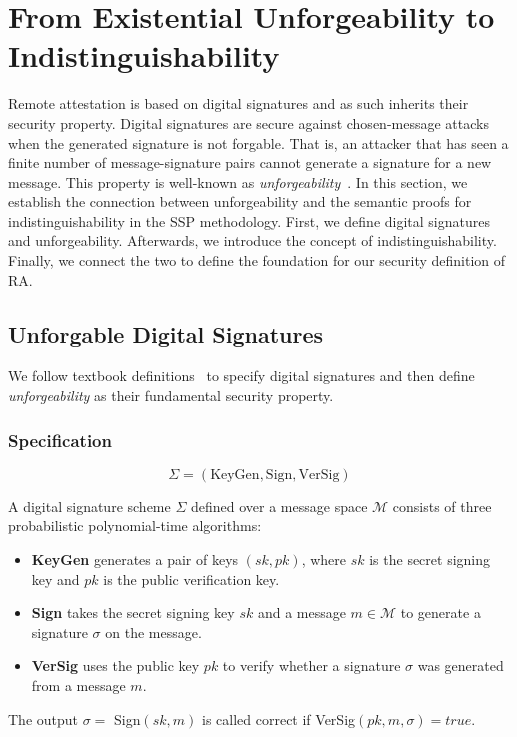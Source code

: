 \section{From Existential Unforgeability to Indistinguishability}
\label{sec:TheoryFound}
%
%
Remote attestation is based on digital signatures and as such
inherits their security property.
%
Digital signatures are secure against chosen-message attacks when
the generated signature is not forgable.
%
That is, an attacker that has seen a finite number of message-signature
pairs cannot generate a signature for a new message.
%
This property is well-known as \emph{unforgeability}~\cite{goldwasser1988digital}.
%
In this section, we establish the connection between
unforgeability and the semantic proofs for indistinguishability in
the SSP methodology.
%
First, we define digital signatures and unforgeability.
%
Afterwards, we introduce the concept of indistinguishability.
%
Finally, we connect the two to define the foundation for
our security definition of RA.
%

\subsection{Unforgable Digital Signatures}

%
We follow textbook definitions~\cite{joy,companion} to specify digital
signatures and then define \emph{unforgeability} as their fundamental
security property.
%

\subsubsection{Specification}
\begin{definition}
  \label{def:sig:scheme}
  \[
  \Sigma=(\text{KeyGen},\text{Sign},\text{VerSig})
  \]
\end{definition}
%
A digital signature scheme $\Sigma$
defined over a message space $\mathcal{M}$ consists
of three probabilistic polynomial-time algorithms:
%
\begin{itemize}
    \item \textbf{KeyGen} generates
    a pair of keys $(sk, pk)$, where $sk$ is the secret signing
    key and $pk$ is the public verification key. 
    \item\textbf{Sign} takes the secret signing key $sk$ and
    a message $m\in\mathcal{M}$ to generate a signature $\sigma$ on the message.
    \item\textbf{VerSig} uses the public key $pk$ to verify whether
    a signature $\sigma$ was generated from a message $m$.
\end{itemize}
%
The output $\sigma =$ Sign$(sk, m)$ is called correct if VerSig$(pk, m, \sigma) = true $. 

